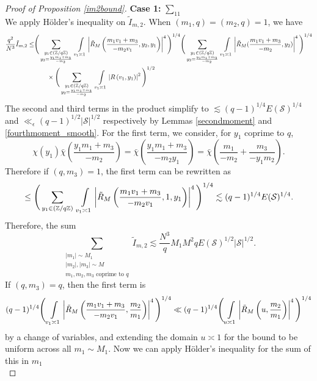\begin{proof}[{Proof of Proposition \ref{im2bound}}]
    \textbf{Case 1:} $\sum_{11}$\\
    We apply H\"older's inequality on $\tilde{I}_{m,2}$. When $(m_1,q)=(m_2,q)=1$, we have \begin{align*}
        \frac{q^2}{N^3}\tilde{I}_{m,2}\leq &
       \Bigg( \sum_{\substack{y_1\in (\mathbb{Z}/q\mathbb{Z})\\y_2=\frac{y_1m_1+m_3}{-m_2}}} \ \int\displaylimits_{v_1\asymp 1}  \left| \tilde{R}_M\left(\frac{m_1v_1+m_3}{-m_2v_1},y_2,y_1\right)\right|^4\Bigg)^{1/4}
       \Bigg( \sum_{\substack{y_1\in (\mathbb{Z}/q\mathbb{Z})\\y_2=\frac{y_1m_1+m_3}{-m_2}}} \ \int\displaylimits_{v_1\asymp 1} \left|\tilde{R}_M(\frac{m_1v_1+m_3}{-m_2},y_2)\right|^4\Bigg)^{1/4}\\
        & \quad \quad    \times     \Bigg(\sum_{\substack{y_1\in (\mathbb{Z}/q\mathbb{Z})\\y_2=\frac{y_1m_1+m_3}{-m_2}}} \ \int\displaylimits_{v_1\asymp 1} \left|R\left(v_1,y_1\right)\right| ^2\Bigg)^{1/2}
    \end{align*}
    The second and third terms in the product simplify to $\lesssim (q-1)^{1/4}E(\mathcal{S})^{1/4}$ and $\ll_\epsilon (q-1)^{1/2}|\mathcal{S}|^{1/2}$ respectively by Lemmas \ref{secondmoment} and \ref{fourthmoment_smooth}. For the first term, we consider, for $y_1$ coprime to $q$, \[
    \chi(y_1)\bar{\chi}\left(\frac{y_1m_1+m_3}{-m_2}\right) = \bar{\chi}\left(\frac{y_1m_1+m_3}{-m_2y_1}\right)=\bar{\chi}\left(\frac{m_1}{-m_2}+\frac{m_3}{-y_1m_2}\right). 
    \]
    Therefore if $(q,m_3)=1$, the first term can be rewritten as \[
        \leq \Bigg( \sum_{y_1\in (\mathbb{Z}/q\mathbb{Z})} \ \int\displaylimits_{v_1\asymp 1}  \left| \tilde{R}_M\left(\frac{m_1v_1+m_3}{-m_2v_1},1,y_1\right)\right|^4\Bigg)^{1/4} \lesssim(q-1)^{1/4} E(\mathcal{S})^{1/4}.
    \]
    Therefore, the sum \[
    \sum_{\substack{|m_1|\sim M_1\\|m_2|,|m_3|\sim M\\
    m_1,m_2,m_3 \textrm{ coprime to } q}} \tilde{I}_{m,2} \lesssim \frac{N^3}{q}M_1M^2q E(\mathcal{S})^{1/2}|\mathcal{S}|^{1/2}.
    \]
    If $(q,m_3)=q$, then the first term is \[
        (q-1)^{1/4}\Bigg(\int\displaylimits_{v_1\asymp 1}  \left| \tilde{R}_M\left(\frac{m_1v_1+m_3}{-m_2v_1},\frac{m_2}{m_1}\right)\right|^4\Bigg)^{1/4}\ll (q-1)^{1/4}\Bigg(\int\displaylimits_{u\asymp 1}  \left| \tilde{R}_M\left(u,\frac{m_2}{m_1}\right)\right|^4\Bigg)^{1/4}
    \]by a change of variables, and extending the domain $u\asymp 1$ for the bound to be uniform across all $m_1\sim M_1$. Now we can apply H\"older's inequality for the sum of this in $m_1$ \[
\]
\end{proof}
